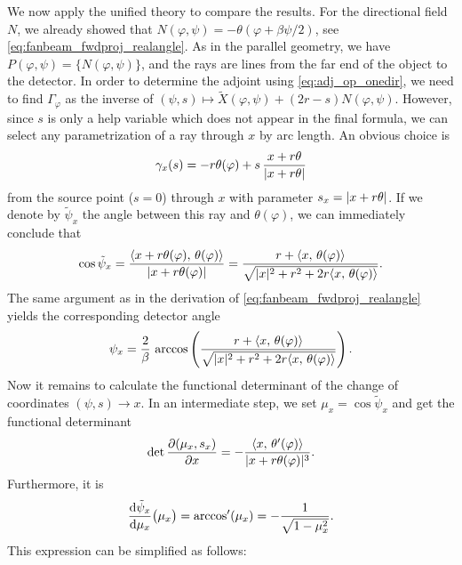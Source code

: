 \documentclass{amsart}
\renewcommand*{\phi}{\varphi}
\begin{document}
\begin{example}
 We now apply the unified theory to compare the results. For the directional field $N$, we already showed that 
 $N(\phi,\psi) = -\theta(\phi + \beta\psi/2)$, see \eqref{eq:fanbeam_fwdproj_realangle}. As in the parallel geometry, we have 
 $P(\phi,\psi) = \lbrace N(\phi,\psi)\rbrace$, and the rays are lines from the far end of the object to the detector. In order to determine 
 the adjoint using \eqref{eq:adj_op_onedir}, we need to find $\Gamma_\phi$ as the inverse of 
 $(\psi, s) \mapsto \tilde X(\phi, \psi) + (2r - s) N(\phi,\psi)$. However, since $s$ is only a help variable which does not appear in the 
 final formula, we can select any parametrization of a ray through $x$ by arc length. An obvious choice is
 \begin{equation*}
  \gamma_x(s) = -r \theta(\phi) + s\, \frac{x + r\theta}{\ABS{x + r\theta}}
 \end{equation*}
 from the source point ($s=0$) through $x$ with parameter $s_x=|x + r\theta|$. If we denote by $\tilde\psi_x$ the angle between this 
ray and  $\theta(\phi)$, we can immediately conclude that
 \begin{equation*}
  \cos \tilde\psi_x = \frac{\INNER{x + r\theta(\phi)}{\theta(\phi)}}{\ABS{x + r\theta(\phi)}} 
  = \frac{r + \INNER{x}{\theta(\phi)}}{\sqrt{\ABS{x}^2 + r^2 + 2r \INNER{x}{\theta(\phi)}}}.
 \end{equation*}
 The same argument as in the derivation of \eqref{eq:fanbeam_fwdproj_realangle} yields the corresponding detector angle
 \begin{equation}
  \label{eq:fanbeam_psi_x}
  \psi_x = \frac{2}{\beta}\, \arccos\left( \frac{r + \INNER{x}{\theta(\phi)}}{\sqrt{\ABS{x}^2 + r^2 + 2r \INNER{x}{\theta(\phi)}}} \right).
 \end{equation}
 Now it remains to calculate the functional determinant of the change of coordinates $(\psi, s) \to x$. In an intermediate step, we set 
 $\mu_x = \cos \tilde\psi_x$ and get the functional determinant
 \begin{equation*}
  \DET \frac{\partial(\mu_x, s_x)}{\partial x} = - \frac{\INNER{x}{\theta'(\phi)}}{\ABS{x + r \theta(\phi)}^3}.
 \end{equation*}
 Furthermore, it is
 \begin{equation*}
  \frac{\mathrm{d} \tilde\psi_x}{\mathrm{d} \mu_x}\big(\mu_x\big) = \arccos'(\mu_x) = - \frac{1}{\sqrt{1 - \mu_x^2}}.
 \end{equation*}
 This expression can be simplified as follows:
 \begin{align*}

\end{align*}
\end{example}
\end{document}
